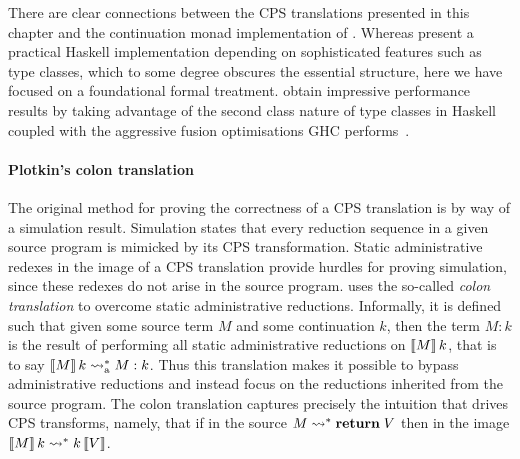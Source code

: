 \documentclass[12pt,phd,lfcs,twoside,openright,logo,leftchapter,normalheadings]{infthesis}
\theoremstyle{plain}
\theoremstyle{definition}
\begin{document}
There are clear connections between the CPS translations presented in
this chapter and the continuation monad implementation of
\citet{KammarLO13}. Whereas \citeauthor{KammarLO13} present a
practical Haskell implementation depending on sophisticated features
such as type classes, which to some degree obscures the essential
structure, here we have focused on a foundational formal treatment.
%
\citeauthor{KammarLO13} obtain impressive performance results by
taking advantage of the second class nature of type classes in Haskell
coupled with the aggressive fusion optimisations GHC
performs~\citep{WuS15}.

\paragraph{Plotkin's colon translation}
%
The original method for proving the correctness of a CPS
translation is by way of a simulation result. Simulation states that
every reduction sequence in a given source program is mimicked by its
CPS transformation.
%
Static administrative redexes in the image of a CPS translation
provide hurdles for proving simulation, since these redexes do not
arise in the source program.
%
\citet{Plotkin75} uses the so-called \emph{colon translation} to
overcome static administrative reductions.
%
Informally, it is defined such that given some source term $M$ and
some continuation $k$, then the term $M : k$ is the result of
performing all static administrative reductions on $\llbracket M \rrbracket\,k$, that
is to say $\llbracket M \rrbracket\,k \leadsto_{\textrm{a}}^* M : k$.
%
Thus this translation makes it possible to bypass administrative
reductions and instead focus on the reductions inherited from the
source program.
%
The colon translation captures precisely the intuition that drives CPS
transforms, namely, that if in the source $M \leadsto^\ast \mathbf{return}\;V$
then in the image $\llbracket M \rrbracket\,k \leadsto^\ast k\,\llbracket V \rrbracket$.





\end{document}
